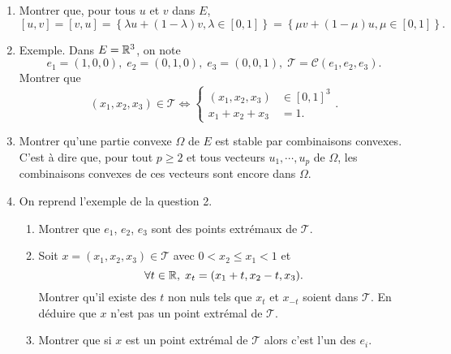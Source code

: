\begin{enumerate}
 \item Montrer que, pour tous $u$ et $v$ dans $E$,
\[
 \left[ u,v \right] = \left[ v , u \right] 
 = \left\lbrace  \lambda u + (1-\lambda)v, \lambda \in \left[0,1 \right] \right\rbrace 
 = \left\lbrace  \mu v + (1-\mu)u, \mu \in \left[0,1 \right] \right\rbrace.
\]
 \item Exemple. Dans $E=\mathbb{R}^3$, on note 
\[
 e_1 = (1,0,0),\; e_2 = (0,1,0),\; e_3 = (0,0,1), \; \mathcal{T} = \mathcal{C}(e_1,e_2,e_3).
\]
Montrer que 
\[
 (x_1, x_2, x_3) \in \mathcal{T}
 \Leftrightarrow
 \left\lbrace 
 \begin{aligned}
  (x_1, x_2, x_3) &\in \left[ 0,1 \right]^3 \\
  x_1 + x_2 + x_3 &= 1.
 \end{aligned}
\right. .
\]

 \item Montrer qu'une partie convexe $\Omega$ de $E$ est stable par combinaisons convexes. C'est à dire que, pour tout $p\geq 2$ et tous vecteurs $u_1, \cdots,u_p$ de $\Omega$, les combinaisons convexes de ces vecteurs sont encore dans $\Omega$.

 \item On reprend l'exemple de la question 2.
 \begin{enumerate}
   \item Montrer que $e_1$, $e_2$, $e_3$ sont des points extrémaux de $\mathcal{T}$.
   \item Soit $x = (x_1,x_2,x_3) \in \mathcal{T}$ avec $0 < x_2 \leq x_1 < 1$ et
\[
 \forall t\in \mathbb{R}, \; x_t = (x_1 + t, x_2 - t,x_3).
\]
Montrer qu'il existe des $t$ non nuls tels que $x_t$ et $x_{-t}$ soient dans $\mathcal{T}$. En déduire que $x$ n'est pas un point extrémal de $\mathcal{T}$.

   \item Montrer que si $x$ est un point extrémal de $\mathcal{T}$ alors c'est l'un des $e_i$.
 \end{enumerate}

\end{enumerate}


